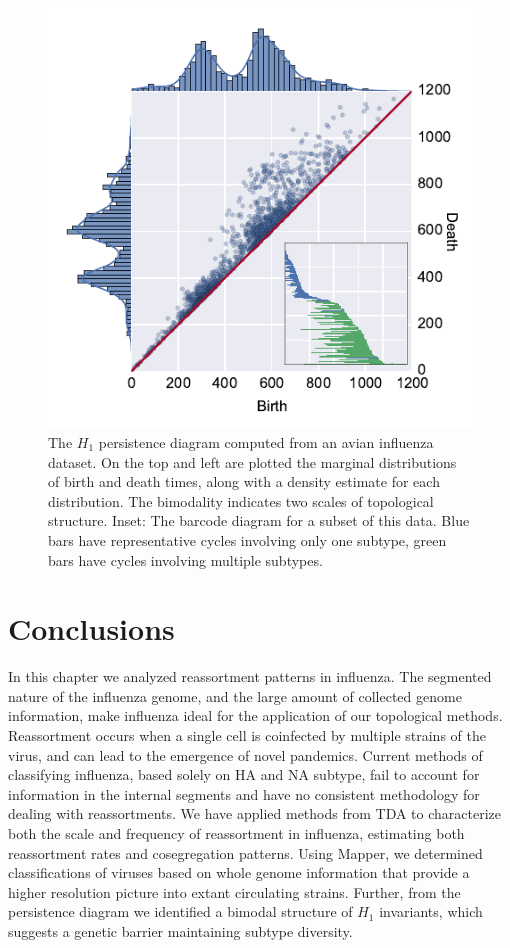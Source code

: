 \begin{figure}
\centering
\includegraphics[width=\columnwidth]{./fig/influenza/flu_scatterplot.pdf}
\caption[$H_1$ persistence diagram computed from an avian influenza dataset.]{The $H_1$ persistence diagram computed from an avian influenza dataset. On the top and left are plotted the marginal distributions of birth and death times, along with a density estimate for each distribution. The bimodality indicates two scales of topological structure. Inset: The barcode diagram for a subset of this data. Blue bars have representative cycles involving only one subtype, green bars have cycles involving multiple subtypes.}
\label{fig:flu:scatterplot}
\end{figure}

\section{Conclusions}
\label{flu:conclusions}

In this chapter we analyzed reassortment patterns in influenza.
The segmented nature of the influenza genome, and the large amount of collected genome information, make influenza ideal for the application of our topological methods.
Reassortment occurs when a single cell is coinfected by multiple strains of the virus, and can lead to the emergence of novel pandemics.
Current methods of classifying influenza, based solely on HA and NA subtype, fail to account for information in the internal segments and have no consistent methodology for dealing with reassortments.
We have applied methods from TDA to characterize both the scale and frequency of reassortment in influenza, estimating both reassortment rates and cosegregation patterns.
Using Mapper, we determined classifications of viruses based on whole genome information that provide a higher resolution picture into extant circulating strains.
Further, from the persistence diagram we identified a bimodal structure of $H_1$ invariants, which suggests a genetic barrier maintaining subtype diversity.
